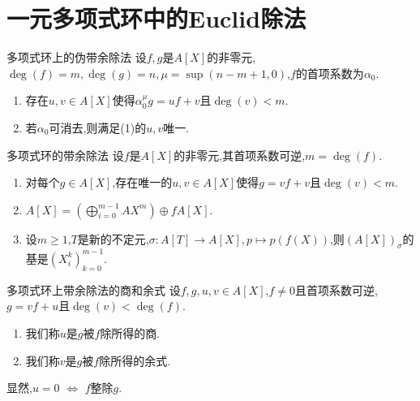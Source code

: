 \section{一元多项式环中的Euclid除法}

\begin{proposition}{多项式环上的伪带余除法}{}
	设$f,g$是$A\left[X\right]$的非零元,$\deg\left(f\right)=m,\deg\left(g\right)=n,\mu=\sup\left(n-m+1,0\right)$,$f$的首项系数为$\alpha_{0}$.
	\begin{enumerate}
		\item 存在$u,v\in A\left[X\right]$使得$\alpha_{0}^{\mu}g=uf+v$且$\deg\left(v\right)<m$.
		\item 若$\alpha_{0}$可消去,则满足(1)的$u,v$唯一.
	\end{enumerate}
\end{proposition}

\begin{corollary}{多项式环的带余除法}{}
	设$f$是$A\left[X\right]$的非零元,其首项系数可逆,$m=\deg\left(f\right)$.
	\begin{enumerate}
		\item 对每个$g\in A\left[X\right]$,存在唯一的$u,v\in A\left[X\right]$使得$g=vf+v$且$\deg\left(v\right)<m$.
		\item $A\left[X\right]=\left(\bigoplus\limits_{i=0}^{m-1}AX^{m}\right)\oplus fA\left[X\right]$.
		\item 设$m\geq 1$,$T$是新的不定元,$\sigma:A\left[T\right]\to A\left[X\right],p\mapsto p\left(f\left(X\right)\right)$,则$\left(A\left[X\right]\right)_{\sigma}$的基是$\left(X_{i}^{k}\right)_{k=0}^{m-1}$.
	\end{enumerate}
\end{corollary}

\begin{definition}{多项式环上带余除法的商和余式}{}
	设$f,g,u,v\in A\left[X\right]$,$f\neq 0$且首项系数可逆,$g=vf+u$且$\deg\left(v\right)<\deg\left(f\right)$.
	\begin{enumerate}
		\item 我们称$u$是$g$被$f$除所得的商.
		\item 我们称$v$是$g$被$f$除所得的余式.
	\end{enumerate}
\end{definition}

\begin{remark}{}{}
	显然,$u=0$ $\iff$ $f$整除$g$.
\end{remark}






























